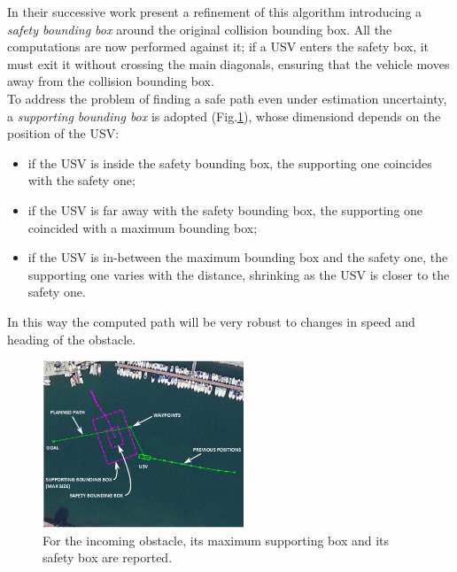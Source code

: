 \documentclass[12pt]{article}
\begin{document}
              \indent In their successive work \textcite{Simetti2014} present a refinement of this algorithm introducing a \textit{safety bounding box} around the original collision bounding box. All the computations are now performed against it; if a USV enters the safety box, it must exit it without crossing the main diagonals, ensuring that the vehicle moves away from the collision bounding box.\\
              To address the problem of finding a safe path even under estimation uncertainty, a \textit{supporting bounding box} is adopted (Fig.\ref{fig:bounding}), whose dimensiond depends on the position of the USV:
                    \begin{itemize}
                          \item if the USV is inside the safety bounding box, the supporting one coincides with the safety one;
                          \item if the USV is far away with the safety bounding box, the supporting one coincided with a maximum bounding box;
                          \item if the USV is in-between the maximum bounding box and the safety one, the supporting one varies with the distance, shrinking as the USV is closer to the safety one.
                    \end{itemize}
              In this way the computed path will be very robust to changes in speed and heading of the obstacle.

              \begin{figure}
                    \centering
                    \includegraphics[height=5cm]{./Images/Simetti/bb}
                    \caption{For the incoming obstacle, its maximum supporting box and its safety box are reported.}
                    \label{fig:bounding}
              \end{figure}
\end{document}
